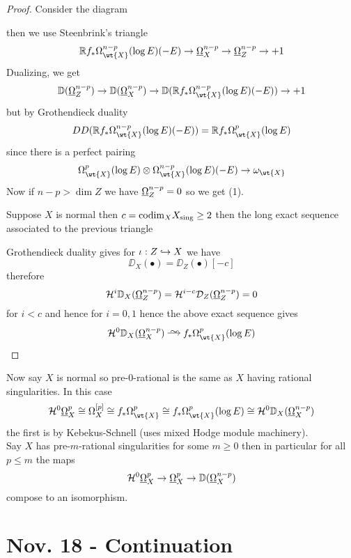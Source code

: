\documentclass[12pt]{article}
\renewcommand{\cH}{\mathcal{H}}
\renewcommand{\codim}{\mathrm{codim}}
\begin{document}
\begin{proof}
Consider the diagram
\begin{center}
\end{center}
then we use Steenbrink's triangle
\[ \RR f_* \Omega_{\wt{X}}^{n-p}(\log{E})(-E) \to \ulO_X^{n-p} \to \ulO_Z^{n-p} \to +1 \]
Dualizing, we get
\[ \DD(\ulO_Z^{n-p}) \to \DD(\ulO_X^{n-p}) \to \DD(\RR f_* \Omega_{\wt{X}}^{n-p}(\log{E})(-E)) \to +1 \]
but by Grothendieck duality
\[ DD(\RR f_* \Omega_{\wt{X}}^{n-p}(\log{E})(-E)) = \RR f_* \Omega_{\wt{X}}^p(\log{E}) \]
since there is a perfect pairing
\[ \Omega_{\wt{X}}^p(\log{E}) \ot \Omega_{\wt{X}}^{n-p}(\log{E})(-E) \to \omega_{\wt{X}} \]
Now if $n - p > \dim{Z}$ we have $\underline{\Omega}_Z^{n-p} = 0$ so we get (1).
\par 
Suppose $X$ is normal then $c = \codim_X X_{\sing} \ge 2$ then the long exact sequence associated to the previous triangle
\begin{center}
\end{center}
Grothendieck duality gives for $\iota : Z \hookrightarrow X$ we have
\[ \DD_X( \bullet) = \DD_Z(\bullet) [-c] \]
therefore
\[ \cH^i \DD_X(\ulO_Z^{n-p}) = \cH^{i-c} \D_Z(\ulO_Z^{n-p}) = 0 \]
for $i < c$ and hence for $i = 0,1$ hence the above exact sequence gives
\[ \cH^0 \DD_X(\ulO_X^{n-p}) \iso f_* \Omega^p_{\wt{X}}(\log{E}) \]
\end{proof}

Now say $X$ is normal so pre-$0$-rational is the same as $X$ having rational singularities. In this case
\[ \cH^0 \ulO_X^p \cong \Omega_X^{[p]} \cong f_* \Omega_{\wt{X}}^p \cong f_* \Omega_{\wt{X}}^p(\log{E}) \cong \cH^0 \DD_X(\ulO_X^{n-p}) \]
the first is by Kebekus-Schnell (uses mixed Hodge module machinery). 
\bigskip\\
Say $X$ has pre-$m$-rational singularities for some $m \ge 0$ then in particular for all $p \le m$ the maps
\[ \cH^0 \ulO_X^p \to \ulO_X^p \to \DD(\ulO_X^{n-p}) \]
compose to an isomorphism. 

\section{Nov. 18 - Continuation}
\end{document}
